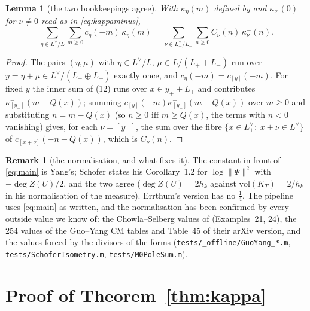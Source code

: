 \documentclass[11pt,reqno]{amsart}
\theoremstyle{plain}
\newtheorem{lemma}[theorem]{Lemma}
\theoremstyle{definition}
\newtheorem{remark}[theorem]{Remark}
\newcommand{\Ldual}{L^{\vee}}
\newcommand{\Lm}{L_{-}}
\newcommand{\Lp}{L_{+}}
\begin{document}
\begin{lemma}[the two bookkeepings agree]\label{lem:regroup}
With $\kappa_\eta(m)$ defined by \cite[(12)]{Yang} and $\kappa^-_\nu(0)$ for $\nu\ne0$ read as in
\eqref{eq:kappaminus},
\[
  \sum_{\eta\in\Ldual/L}\sum_{m\ge0}c_\eta(-m)\,\kappa_\eta(m)=\sum_{\nu\in\Lm^\vee/\Lm}\sum_{n\ge0}
  C_\nu(n)\,\kappa^-_\nu(n).
\]
\end{lemma}
\begin{proof}
The pairs $(\eta,\mu)$ with $\eta\in\Ldual/L$, $\mu\in L/(\Lp+\Lm)$ run over
$y=\eta+\mu\in\Ldual/(\Lp\oplus\Lm)$ exactly once, and $c_\eta(-m)=c_{[y]}(-m)$. For fixed $y$ the
inner sum of (12) runs over $x\in y_++\Lp$ and contributes $\kappa^-_{[y_-]}(m-Q(x))$; summing
$c_{[y]}(-m)\kappa^-_{[y_-]}(m-Q(x))$ over $m\ge0$ and substituting $n=m-Q(x)$ (so $n\ge0$ iff
$m\ge Q(x)$, the terms with $n<0$ vanishing) gives, for each $\nu=[y_-]$, the sum over the fibre
$\{x\in\Lp^\vee:\ x+\nu\in\Ldual\}$ of $c_{[x+\nu]}(-n-Q(x))$, which is $C_\nu(n)$.
\end{proof}

\begin{remark}[the normalisation, and what fixes it]\label{rem:norm}
The constant in front of \eqref{eq:main} is Yang's; Schofer states his Corollary~1.2 for
$\log\lVert\Psi\rVert^2$ with $-\deg Z(U)/2$, and the two agree ($\deg Z(U)=2h_k$ against
$\mathrm{vol}(K_T)=2/h_k$ in his normalisation of the measure). Errthum's version \cite{Err} has
no $\tfrac14$. The pipeline uses \eqref{eq:main} as written, and the normalisation has been
confirmed by every outside value we know of: the Chowla--Selberg values of \cite[\S4]{Yang}
(Examples~21, 24), the 254 values of the Guo--Yang CM tables and Table~45 of their arXiv version,
and the values forced by the divisors of the forms (\texttt{tests/\_offline/GuoYang\_*.m},
\texttt{tests/SchoferIsometry.m}, \texttt{tests/M0PoleSum.m}).
\end{remark}

\section{Proof of Theorem~\ref{thm:kappa}}\label{sec:proofkappa}
\end{document}
